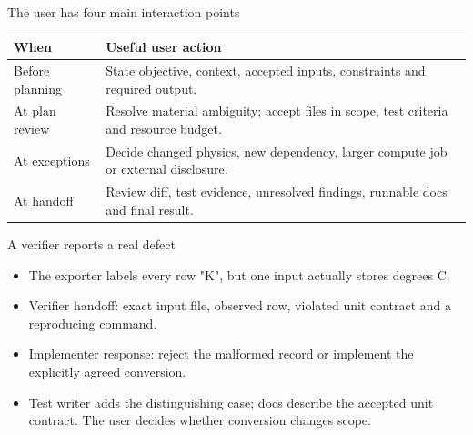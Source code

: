 \documentclass[aspectratio=169,11pt]{beamer}
\begin{document}
\begin{frame}[t,fragile]{The user has four main interaction points}
\fontsize{10.5}{12.5}\selectfont\setlength{\tabcolsep}{4pt}\renewcommand{\arraystretch}{1.15}
\begin{tabular}{>{\raggedright\arraybackslash}p{}>{\raggedright\arraybackslash}p{}}
\toprule
\textbf{When} & \textbf{Useful user action} \\ \midrule
Before planning & State objective, context, accepted inputs, constraints and required output. \\[2pt]
At plan review & Resolve material ambiguity; accept files in scope, test criteria and resource budget. \\[2pt]
At exceptions & Decide changed physics, new dependency, larger compute job or external disclosure. \\[2pt]
At handoff & Review diff, test evidence, unresolved findings, runnable docs and final result. \\[2pt]
\bottomrule\end{tabular}\par\vspace{2mm}
\end{frame}
\begin{frame}[t,fragile]{A verifier reports a real defect}
\fontsize{11.5}{14}\selectfont
\begin{itemize}\setlength{\itemsep}{2mm}
\item The exporter labels every row "K", but one input actually stores degrees C.
\item Verifier handoff: exact input file, observed row, violated unit contract and a reproducing command.
\item Implementer response: reject the malformed record or implement the explicitly agreed conversion.
\item Test writer adds the distinguishing case; docs describe the accepted unit contract. The user decides whether conversion changes scope.
\end{itemize}
\end{frame}
\end{document}
